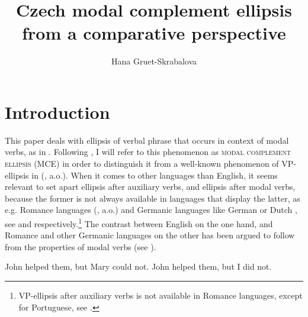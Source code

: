 \documentclass[output=paper,colorlinks,citecolor=brown,
modfonts
]{langscibook}
\title{Czech modal complement ellipsis from a comparative perspective}
\author{
 Hana Gruet-Skrabalova\affiliation{Université Clermont Auvergne, \\Laboratoire de recherche sur le langage}
}
\begin{document}
\maketitle

\section{Introduction} \label{sec:1}
This paper deals with ellipsis of verbal phrase that occurs in context of modal verbs, as in . Following \cite{Aelbrecht2008}, I will refer to this phenomenon as \textsc{modal complement ellipsis} (MCE) in order to distinguish it from a well-known phenomenon of VP-ellipsis in  (\citealt{Ross1969,Sag1976,Merchant2001}, a.o.). When it comes to other languages than English, it seems relevant to set apart ellipsis after auxiliary verbs, and ellipsis after modal verbs, because the former is not always available in languages that display the latter, as e.g. Romance languages (\citealt{busquets2001ellipse,Depiante2001,Dagnac2008,Dagnac2010}, a.o.) and Germanic languages like German or Dutch \citep{Lobeck1995,Aelbrecht2008}, see  and  respectively.\footnote{VP-ellipsis after auxiliary verbs is not available in Romance languages, except for Portuguese, see \cite{Cyrino-Matos2002}.} The contrast between English on the one hand, and Romance and other Germanic languages on the other has been argued to follow from the properties of modal verbs (see  ).

\begin{exe}
\ex \label{english}
\begin{xlist}
\ex\label{1a} John helped them, but Mary could not.
\ex \label{1b}John helped them, but I did not.
\end{xlist}	

\ex	
\begin{xlist}\label{2}
\end{xlist}

\ex	
\begin{xlist}\label{3}
\end{xlist}
\end{exe} 
\end{document}
